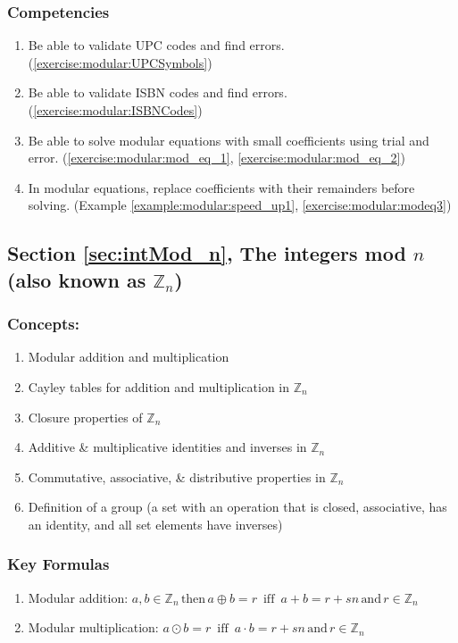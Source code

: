 \subsubsection*{Competencies}
\begin{enumerate}
\item
Be able to validate UPC codes and find errors. (\ref{exercise:modular:UPCSymbols}) 
\item
Be able to validate ISBN codes and find errors. (\ref{exercise:modular:ISBNCodes}) 
\item
Be able to solve modular equations with small coefficients using trial and error. (\ref{exercise:modular:mod_eq_1}, \ref{exercise:modular:mod_eq_2})
\item
In modular equations, replace coefficients with their remainders before solving. (Example \ref{example:modular:speed_up1}, \ref{exercise:modular:modeq3})
\end{enumerate}


\subsection*{Section \ref{sec:intMod_n}, The integers mod $n$ (also known as ${\mathbb Z}_{n}$)}
\subsubsection*{Concepts:}
\begin{enumerate}
\item 
Modular addition and multiplication
\item
Cayley tables for addition and multiplication in ${\mathbb Z}_{n}$
\item
Closure properties of ${\mathbb Z}_{n}$
\item
Additive \& multiplicative identities and inverses in ${\mathbb Z}_{n}$
\item
Commutative, associative, \& distributive properties in ${\mathbb Z}_{n}$
\item
Definition of a group (a set with an operation that is closed, associative, has an identity, and all set elements have inverses)
\end{enumerate}

\subsubsection*{Key Formulas}
\begin{enumerate}
\item
Modular addition: $a, b \in {\mathbb Z}_{n}\, \text{then}\, a \oplus b = r\,\mbox{ iff }\, a + b = r + sn \, \text{and} \, r \in {\mathbb Z}_{n}$
\item
Modular multiplication: $a \odot b = r \, \mbox{ iff } \, a \cdot b = r + sn \, \text{and} \, r \in {\mathbb Z}_{n}$

\end{enumerate}

